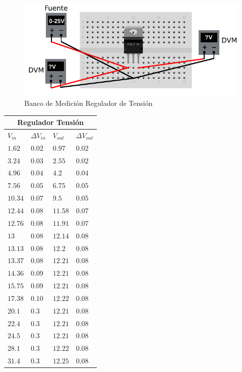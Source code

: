 \documentclass[12pt,a4paper]{article}
\begin{document}
			\begin{figure}[H]
			\centering
				\includegraphics[scale=1]{images/reg.pdf}\caption{Banco de Medición Regulador de Tensión}\label{fig:banco0}
			\end{figure}

			\begin{center}
			{\footnotesize \begin{tabular}{ |l|l|l|l| }

			\hline
				\multicolumn{4}{|c|}{\textbf{Regulador Tensión}}\\ \hline
				$V_{in}$ & $\Delta V_{in}$ & $V_{out}$ & $\Delta V_{out}$ \\ \hline
				$1.62$ & $0.02$ & $0.97$ & $0.02$\\ \hline
				$3.24$ & $0.03$ & $2.55$ & $0.02$\\ \hline
				$4.96$ & $0.04$ & $4.2$ & $0.04$\\ \hline
				$7.56$ & $0.05$ & $6.75$ & $0.05$\\ \hline
				$10.34$ & $0.07$ &  $9.5$ & $0.05$\\ \hline
				$12.44$ & $0.08$ & $11.58$ & $0.07$\\ \hline
				$12.76$ & $0.08$ & $11.91$ & $0.07$\\ \hline
				$13$ & $0.08$ & $12.14$ & $0.08$\\ \hline
				$13.13$ & $0.08$ & $12.2$ & $0.08$\\ \hline
				$13.37$ & $0.08$ & $12.21$ & $0.08$\\ \hline
				$14.36$ & $0.09$ & $12.21$ & $0.08$\\ \hline
				$15.75$ & $0.09$ & $12.21$ & $0.08$ \\ \hline
				$17.38$ & $0.10$ & $12.22$ & $0.08$\\ \hline
				$20.1$ & $0.3$ &  $12.21$ & $0.08$ \\ \hline
				$22.4$ & $0.3$ &  $12.21$ & $0.08$ \\ \hline
				$24.5$ & $0.3$ &  $12.21$ & $0.08$ \\ \hline
				$28.1$ & $0.3$ &  $12.22$ & $0.08$ \\ \hline
				$31.4$ & $0.3$ &  $12.25$ & $0.08$ \\ \hline			
 				
				
			\end{tabular}}\label{tab:regtension}
			\end{center}
\end{document}
